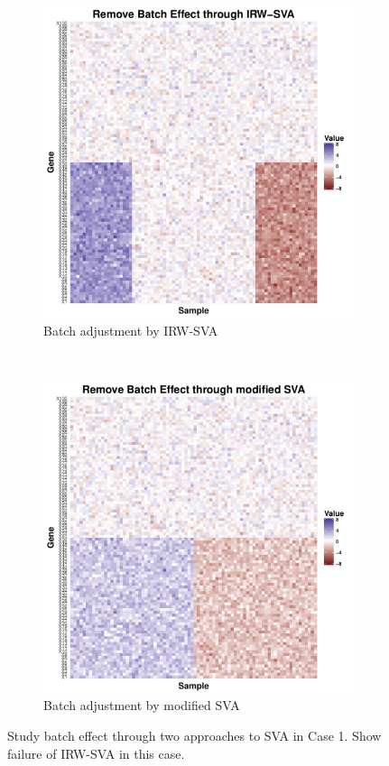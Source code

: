 \documentclass[11pt]{article}
\begin{document}
\begin{figure}[h!]
\begin{subfigure}[b]{0.31\textwidth}
        \includegraphics[width = \textwidth]{figures/sva1.pdf}
        \caption{Batch adjustment by IRW-SVA}
        \label{fig:sva1}
    \end{subfigure}  %
~
    \begin{subfigure}[b]{0.31\textwidth}
        \centering
        \includegraphics[width = \textwidth]{figures/new_sva1.pdf}
        \caption{Batch adjustment by modified SVA}
        \label{fig:new_sva1}
    \end{subfigure}    
    \caption{Study batch effect through two approaches to SVA in Case 1. Show failure of IRW-SVA in this case.}
    \label{fig:svas1}
\end{figure}
\end{document}
